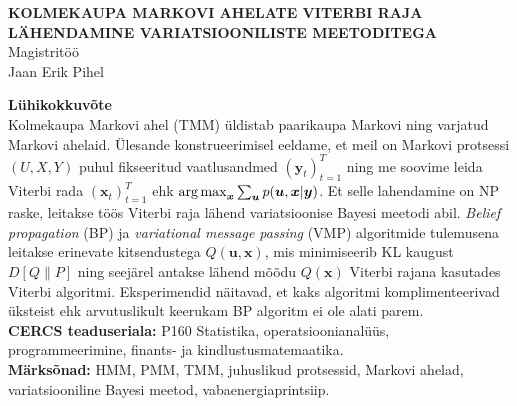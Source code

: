 \small{

\begin{center}
\MakeUppercase{\textbf{Kolmekaupa Markovi ahelate Viterbi raja lähendamine variatsiooniliste meetoditega}}\\
Magistritöö\\
Jaan Erik Pihel\\
\end{center}

\normalsize{\textbf{Lühikokkuvõte}}\\
Kolmekaupa Markovi ahel (TMM) üldistab paarikaupa Markovi ning varjatud Markovi ahelaid. Ülesande konstrueerimisel eeldame, et meil on Markovi protsessi $(U,X,Y)$ puhul fikseeritud vaatlusandmed $(\bm{y}_t)_{t=1}^T$ ning me soovime leida Viterbi rada $(\bm{x}_t)_{t=1}^T$ ehk $\operatorname*{arg\,max}_{\bm{x}} \sum_{\bm{u}}p(\bm{u},\bm{x}|\bm{y})$. Et selle lahendamine on NP raske, leitakse töös Viterbi raja lähend variatsioonise Bayesi meetodi abil. \emph{Belief propagation} (BP) ja \emph{variational message passing} (VMP) algoritmide tulemusena leitakse erinevate kitsendustega $Q(\bm{u},\bm{x})$, mis minimiseerib KL kaugust $D[Q \| P]$ ning seejärel antakse lähend mõõdu $Q(\bm{x})$ Viterbi rajana kasutades Viterbi algoritmi. Eksperimendid näitavad, et kaks algoritmi komplimenteerivad üksteist ehk arvutuslikult keerukam BP algoritm ei ole alati parem. \\
\textbf{CERCS teaduseriala:} P160 Statistika, operatsioonianalüüs, programmeerimine, finants- ja kindlustusmatemaatika.\\
\textbf{Märksõnad:} HMM, PMM, TMM, juhuslikud protsessid, Markovi ahelad, variatsiooniline Bayesi meetod, vabaenergiaprintsiip.\\
}

\pagebreak


